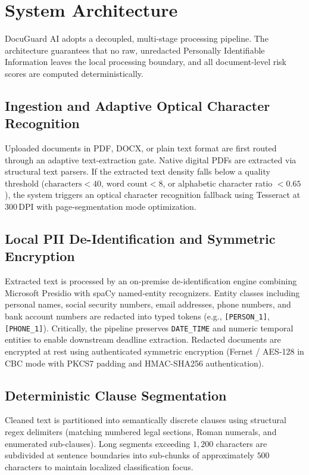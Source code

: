 \documentclass[conference]{IEEEtran}
\begin{document}
\section{System Architecture}
\label{sec:architecture}
DocuGuard AI adopts a decoupled, multi-stage processing pipeline. The architecture guarantees that no raw, unredacted Personally Identifiable Information leaves the local processing boundary, and all document-level risk scores are computed deterministically.

\subsection{Ingestion and Adaptive Optical Character Recognition}
Uploaded documents in PDF, DOCX, or plain text format are first routed through an adaptive text-extraction gate. Native digital PDFs are extracted via structural text parsers. If the extracted text density falls below a quality threshold ($\text{characters} < 40$, $\text{word count} < 8$, or alphabetic character ratio $< 0.65$), the system triggers an optical character recognition fallback using Tesseract at $300\,\text{DPI}$ with page-segmentation mode optimization.

\subsection{Local PII De-Identification and Symmetric Encryption}
Extracted text is processed by an on-premise de-identification engine combining Microsoft Presidio with spaCy named-entity recognizers. Entity classes including personal names, social security numbers, email addresses, phone numbers, and bank account numbers are redacted into typed tokens (e.g., \texttt{[PERSON\_1]}, \texttt{[PHONE\_1]}). Critically, the pipeline preserves \texttt{DATE\_TIME} and numeric temporal entities to enable downstream deadline extraction. Redacted documents are encrypted at rest using authenticated symmetric encryption (Fernet / AES-128 in CBC mode with PKCS7 padding and HMAC-SHA256 authentication).

\subsection{Deterministic Clause Segmentation}
Cleaned text is partitioned into semantically discrete clauses using structural regex delimiters (matching numbered legal sections, Roman numerals, and enumerated sub-clauses). Long segments exceeding $1,200$ characters are subdivided at sentence boundaries into sub-chunks of approximately $500$ characters to maintain localized classification focus.
\end{document}
